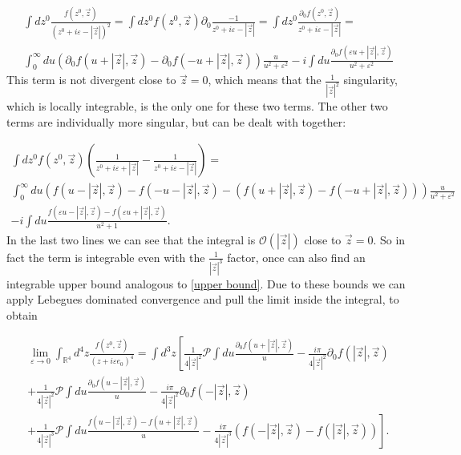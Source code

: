 \documentclass[a4paper,11pt]{article}
\begin{document}
\begin{align}
\int d z^0 \frac{f(z^0,\vec{z})}{(z^0+i\varepsilon -|\vec{z}|)^2}
=\int d z^0 f(z^0,\vec{z})\partial_0 \frac{-1}{z^0+i\varepsilon -|\vec{z}|}
=\int d z^0 \frac{\partial_0 f(z^0,\vec{z})}{z^0+i\varepsilon -|\vec{z}|}=\\
\int_0^\infty du (\partial_0 f(u+|\vec{z}|,\vec{z}) - \partial_0 f(-u +|\vec{z}|,\vec{z}))\frac{u}{u^2+\varepsilon^2}
-i \int du \frac{\partial_0 f(\varepsilon u +|\vec{z}|,\vec{z})}{u^2 + \varepsilon^2}
\end{align}
This term is not divergent close to \(\vec{z}=0\), which means that the \(\frac{1}{|\vec{z}|^2}\) singularity, which is locally integrable, is the only one for these two terms.
The other two terms are individually more singular, but can be dealt with together:

\begin{align}
\int d z^0 f(z^0,\vec{z}) \left( \frac{1}{z^0 + i \varepsilon + |\vec{z}|} - \frac{1}{z^0 + i \varepsilon -|\vec{z}|}\right)=\\
\int_0^\infty du \left(f(u-|\vec{z}|,\vec{z})-f(-u-|\vec{z}|,\vec{z}) -(f(u+|\vec{z}|,\vec{z})-f(-u+|\vec{z}|,\vec{z}))\right)\frac{u}{u^2+\varepsilon^2}\\
-i \int du \frac{f(\varepsilon u - |\vec{z}|,\vec{z}) - f(\varepsilon u +|\vec{z}|,\vec{z})}{u^2+1}.
\end{align}
In the last two lines we can see that the integral is \(\mathcal{O}(|\vec{z}|)\) close to \(\vec{z}=0\). 
So in fact the term is integrable even with the \(\frac{1}{|\vec{z}|^3}\) factor, 
once can also find an integrable upper bound analogous to \eqref{upper bound}.
Due to these bounds we can apply Lebegues dominated convergence and pull the limit inside the integral, to obtain

\begin{align}
\lim_{\varepsilon \rightarrow 0} \int_{\mathbb{R}^4} d^4z \frac{f(z^0,\vec{z})}{(z+i\varepsilon e_0)^4} =
\int d^3 z \left[ \frac{1}{4|\vec{z}|^2} \mathcal{P} \int du \frac{\partial_0 f(u+|\vec{z}|,\vec{z})}{u} -\frac{i\pi}{4 |\vec{z}|^2} \partial_0 f(|\vec{z}|,\vec{z}) \right.\\
+\frac{1}{4|\vec{z}|^2} \mathcal{P} \int du \frac{\partial_0 f(u-|\vec{z}|,\vec{z})}{u} - \frac{i\pi}{4|\vec{z}|^2} \partial_0 f(-|\vec{z}|,\vec{z})\\
\left. +\frac{1}{4|\vec{z}|^3} \mathcal{P}\int du \frac{f(u-|\vec{z}|,\vec{z})-f(u+|\vec{z}|,\vec{z})}{u} - \frac{i \pi }{4 |\vec{z}|^3} (f(-|\vec{z}|,\vec{z})-f(|\vec{z}|,\vec{z}))\right].
\end{align}
\end{document}
